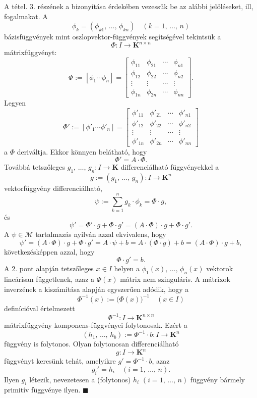 \documentclass{article}
\newcommand{\K}{\mathbf{K}}
\begin{document}
	A tétel. 3. részének a bizonyítása érdekében vezessük be az alábbi jelöléseket, ill, fogalmakat. A
	\[
		\phi_k = (\phi_{k1}, \, \dots, \, \phi_{kn}) \quad (k=1, \, \dots, \, n)
	\]
	bázisfüggvények mint oszlopvektor-függvények segítségével tekintsük a
	\[
		\Phi : I \to \K^{n \times n}
	\]
	mátrixfüggvényt:
	\[
		\Phi := [\phi_1 \cdots \phi_n] = \begin{bmatrix}
			\phi_{11} & \phi_{21} & \cdots & \phi_{n1} \\
			\phi_{12} & \phi_{22} & \cdots & \phi_{n2} \\
			\vdots & \vdots & \cdots & \vdots \\
			\phi_{1n} & \phi_{2n} & \cdots & \phi_{nn}
		\end{bmatrix}.
	\]
	Legyen
	\[
		\Phi' := [\phi'_1 \cdots \phi'_n] = \begin{bmatrix}
			\phi'_{11} & \phi'_{21} & \cdots & \phi'_{n1} \\
			\phi'_{12} & \phi'_{22} & \cdots & \phi'_{n2} \\
			\vdots & \vdots & \cdots & \vdots \\
			\phi'_{1n} & \phi'_{2n} & \cdots & \phi'_{nn}
		\end{bmatrix}
	\]
	a $\Phi$ deriváltja. Ekkor könnyen belátható, hogy
	\[
		\Phi' = A \cdot \Phi.
	\]
	Továbbá tetszőleges $g_1, \, \dots, \, g_n : I \to \K$ differenciálható függvényekkel a
	\[
		g := (g_1, \, \dots, \, g_n) : I \to \K^n
	\]
	vektorfüggvény differenciálható,
	\[
		\psi := \sum_{k=1}^n g_k \cdot \phi_k = \Phi \cdot g,
	\]
	és
	\[
		\psi' = \Phi' \cdot g + \Phi \cdot g' = (A \cdot \Phi) \cdot g + \Phi \cdot g'.
	\]
	A $\psi \in \mathcal{M}$ tartalmazás nyilván azzal ekvivalens, hogy
	\[
		\psi' = (A \cdot \Phi) \cdot g + \Phi \cdot g' = A \cdot \psi + b = A \cdot (\Phi \cdot g) + b = (A \cdot \Phi) \cdot g + b,
	\]
	következésképpen azzal, hogy
	\[
		\Phi \cdot g' = b.
	\]
	A 2. pont alapján tetszőleges $x \in I$ helyen a $\phi_1(x), \, \dots, \, \phi_n(x)$ vektorok lineárisan függetlenek, azaz a $\Phi(x)$ mátrix nem szinguláris. A mátrixok inverzének a kiszámítása alapján egyszerűen adódik, hogy a
	\[
		\Phi^{-1}(x) := \big( \Phi(x) \big)^{-1} \quad (x \in I)
	\]
	definícióval értelmezett
	\[
		\Phi^{-1} : I \to \K^{n\times n}
	\]
	mátrixfüggvény komponens-függvényei folytonosak. Ezért a
	\[
		(h_1, \, \dots, \, h_b) := \Phi^{-1} \cdot b : I \to \K^n
	\]
	függvény is folytonos. Olyan folytonosan differenciálható
	\[
		g : I \to \K^n
	\]
	függvényt keresünk tehát, amelyikre $g' = \Phi^{-1} \cdot b$, azaz
	\[
		g_i' = h_i \quad (i = 1, \, \dots, \, n).
	\]
	Ilyen $g_i$ létezik, nevezetesen a (folytonos) $h_i$ $(i = 1, \, \dots, \, n)$ függvény bármely primitív függvénye ilyen. $\blacksquare$\\
	
\end{document}
